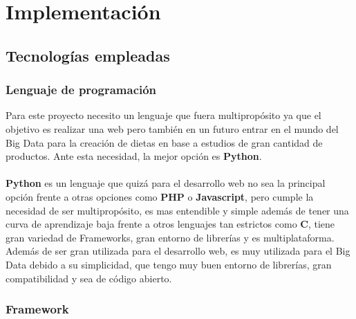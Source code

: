 \chapter{Implementación}

\section{Tecnologías empleadas}

\subsection{Lenguaje de programación}

Para este proyecto necesito un lenguaje que fuera multipropósito ya que el objetivo es realizar una web pero también en un futuro entrar en el mundo del Big Data para la creación de dietas en base a estudios de gran cantidad de productos.
Ante esta necesidad, la mejor opción es \textbf{Python}.\\\\
\textbf{Python} es un lenguaje que quizá para el desarrollo web no sea la principal opción frente a otras opciones como \textbf{PHP} o \textbf{Javascript}, pero cumple 
la necesidad de ser multipropósito, es mas entendible y simple además de tener una curva de aprendizaje baja frente a otros lenguajes tan estrictos como \textbf{C}, 
tiene gran variedad de Frameworks, gran entorno de librerías y es multiplataforma.\\
Además de ser gran utilizada para el desarrollo web, es muy utilizada para el Big Data debido a su simplicidad, que tengo muy buen entorno de librerías, gran compatibilidad y sea de código abierto.

\subsection{Framework}

